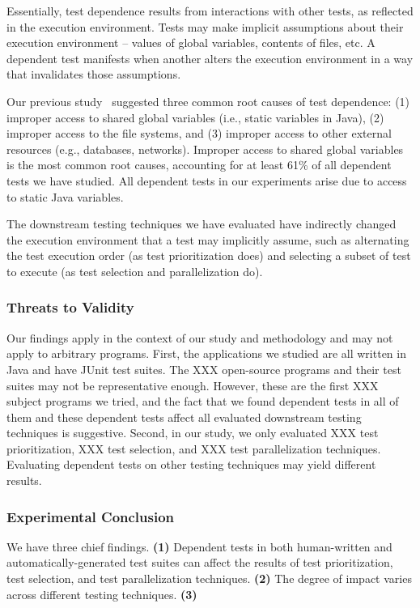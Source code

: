 Essentially, test dependence results from
interactions with other tests, as reflected in
the execution environment. Tests may make
implicit assumptions about their execution environment --
values of global variables, contents of files, etc. A dependent
test manifests when another alters the execution environment
in a way that invalidates those assumptions.

Our previous study~\cite{} suggested three common
root causes of test dependence: (1) improper access
to shared global variables (i.e., static
variables in Java), (2) improper access
to the file systems, and (3) improper access
to other external resources (e.g., databases,
networks). Improper access to
shared global variables is the most common
root causes, accounting for at least 61\% of 
all dependent tests we have studied. All dependent
tests in our experiments arise due to access
to static Java variables.

The downstream testing techniques we have evaluated
have indirectly changed the execution environment
that a test may implicitly assume, such as alternating
the test execution order (as test prioritization
does) and selecting a subset of
test to execute (as test selection and parallelization
do).



\subsubsection{Threats to Validity}

Our findings apply in the context of our
study and methodology and may not apply to arbitrary
programs. First, the applications we studied are all written
in Java and have JUnit test suites.
The XXX open-source programs and
their test suites may not be representative enough.
However, these are the first XXX subject programs we
tried, and the fact that we found dependent tests in all of
them and these dependent tests affect all evaluated
downstream testing techniques is suggestive.
Second, in our study, we only evaluated XXX
test prioritization, XXX test selection, and
XXX test parallelization techniques. Evaluating
dependent tests on other testing techniques
may yield different results.

\subsubsection{Experimental Conclusion}

We have three chief findings. \textbf{(1)}
Dependent tests in both human-written
and automatically-generated test suites
can affect the results of test prioritization,
test selection, and test parallelization
techniques. \textbf{(2)} The degree of 
impact varies across different testing
techniques. 
\textbf{(3)} 
